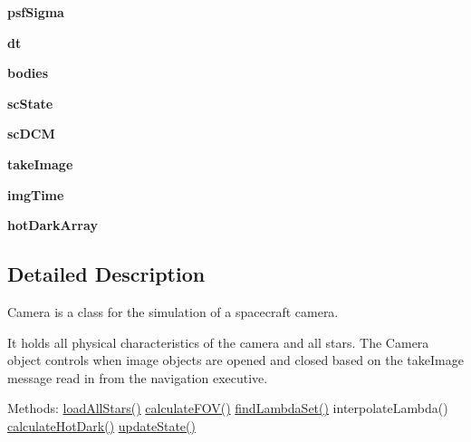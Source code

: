 \begin{DoxyCompactItemize}
\mbox{\label{classcamera_1_1camera_a73bf72ebd48f21558fea1481501ffa28}} 
{\bfseries psf\+Sigma}
\item 
\mbox{\label{classcamera_1_1camera_a59cf567d49e85cc679f2bb7ed0f7b4a5}} 
{\bfseries dt}
\item 
\mbox{\label{classcamera_1_1camera_a22ef11ead56538d782a086465971d170}} 
{\bfseries bodies}
\item 
\mbox{\label{classcamera_1_1camera_a8f16d39f3c02ff44cf0f6f74161ce6f5}} 
{\bfseries sc\+State}
\item 
\mbox{\label{classcamera_1_1camera_a8ab645683dde206807299b62eae8d2ba}} 
{\bfseries sc\+D\+CM}
\item 
\mbox{\label{classcamera_1_1camera_ac5777e158c9f3fdb3e444ebcfb3e7415}} 
{\bfseries take\+Image}
\item 
\mbox{\label{classcamera_1_1camera_a425f1508e751313e6cd5423cffc6a933}} 
{\bfseries img\+Time}
\item 
\mbox{\label{classcamera_1_1camera_acda11b2fb0bbd65ded9693daf1849060}} 
{\bfseries hot\+Dark\+Array}
\end{DoxyCompactItemize}


\subsection{Detailed Description}
Camera is a class for the simulation of a spacecraft camera. 

It holds all physical characteristics of the camera and all stars. The Camera object controls when image objects are opened and closed based on the take\+Image message read in from the navigation executive.

Methods\+: \hyperlink{classcamera_1_1camera_a19a245a417b72f0ae753b5200b1615ff}{load\+All\+Stars()} \hyperlink{classcamera_1_1camera_ad4494bee9257f3d3456b93d26ba9a5a0}{calculate\+F\+O\+V()} \hyperlink{classcamera_1_1camera_aeec423a87b32526d88ca5db5c662a462}{find\+Lambda\+Set()} interpolate\+Lambda() \hyperlink{classcamera_1_1camera_ad4aee85257a01b49869bf21a4ce6f7f8}{calculate\+Hot\+Dark()} \hyperlink{classcamera_1_1camera_afd4c4aea63d44aa43d53ccd4110be3a8}{update\+State()}

